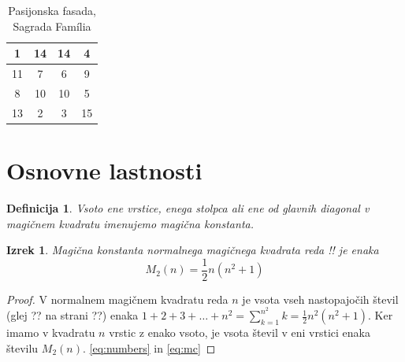 \documentclass[a4paper,12pt]{article}
\begin{document}
\begin{table}[h]
   \centering
   \caption{Pasijonska fasada, Sagrada Família}  %
   \label{table:sagrada}  %
   
   \begin{tabular}{|c|c|c|c|}  %
   \hline  %
   1 & 14 & 14 & 4 \\ \hline
   11 & 7 & 6 & 9 \\ \hline
   8 & 10 & 10 & 5 \\ \hline
   13 & 2 & 3 & 15 \\ \hline
   \end{tabular}
   
   \end{table}


\section{Osnovne lastnosti}

\newtheorem{definicija}{Definicija}
\newtheorem{izrek}{Izrek}

\begin{definicija}
   Vsoto ene vrstice, enega stolpca ali ene od glavnih diagonal
   v magičnem kvadratu imenujemo \emph{magična konstanta}.
\end{definicija}

\begin{izrek}%
   Magična konstanta normalnega magičnega kvadrata reda !!
   je enaka
   \begin{equation}
      \label{eq:mc}%
      M_2(n) = \frac{1}{2} n(n^2+1)
   \end{equation}
\end{izrek}%

\begin{proof}%
   V normalnem magičnem kvadratu reda $n$ je vsota vseh nastopajočih
   števil (glej ?? na strani ??) enaka
   $1+2+3+\dots+n^2=\sum_{k=1}^{n^2}k=\frac{1}{2}n^2(n^2+1)$. Ker imamo
   v kvadratu $n$ vrstic z enako vsoto, je vsota števil v eni vrstici
   enaka številu $M_2(n)$. \ref{eq:numbers} in \ref{eq:mc} %
\end{proof}%
\end{document}
